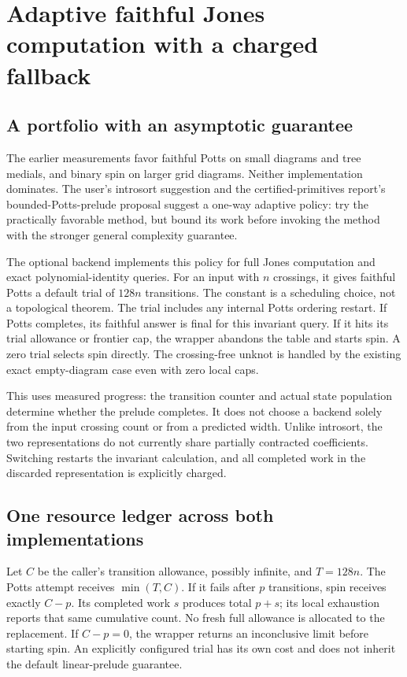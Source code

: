 \section{Adaptive faithful Jones computation with a charged fallback}
\label{sec:adaptive-jones}

\subsection{A portfolio with an asymptotic guarantee}
The earlier measurements favor faithful Potts on small diagrams and tree
medials, and binary spin on larger grid diagrams. Neither implementation
dominates. The user's introsort suggestion and the certified-primitives
report's bounded-Potts-prelude proposal suggest a one-way adaptive policy:
try the practically favorable method, but bound its work before invoking
the method with the stronger general complexity guarantee.

The optional  backend implements this policy for
full Jones computation and exact polynomial-identity queries. For an input
with $n$ crossings, it gives faithful Potts a default trial of $128n$
transitions. The constant is a scheduling choice, not a topological theorem.
The trial includes any internal Potts ordering restart. If Potts completes,
its faithful answer is final for this invariant query. If it hits its trial
allowance or frontier cap, the wrapper abandons the table and starts spin.
A zero trial selects spin directly. The crossing-free unknot is handled by
the existing exact empty-diagram case even with zero local caps.

This uses measured progress: the transition counter and actual state
population determine whether the prelude completes. It does not choose a
backend solely from the input crossing count or from a predicted width.
Unlike introsort, the two representations do not currently share partially
contracted coefficients. Switching restarts the invariant calculation, and
all completed work in the discarded representation is explicitly charged.

\subsection{One resource ledger across both implementations}
Let $C$ be the caller's transition allowance, possibly infinite, and $T=128n$.
The Potts attempt receives $\min(T,C)$. If it fails after $p$ transitions,
spin receives exactly $C-p$. Its completed work $s$ produces total $p+s$;
its local exhaustion reports that same cumulative count. No fresh full
allowance is allocated to the replacement. If $C-p=0$, the wrapper returns
an inconclusive limit before starting spin. An explicitly configured trial
has its own cost and does not inherit the default linear-prelude guarantee.

